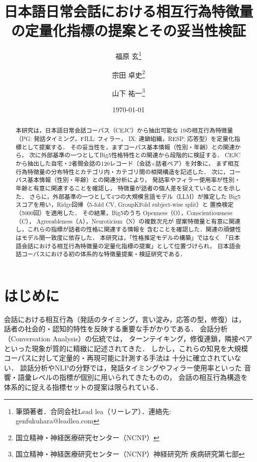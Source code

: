 \documentclass[dvipdfmx,11pt,a4paper]{bxjsarticle}
\title{日本語日常会話における相互行為特徴量の定量化指標の提案とその妥当性検証}
\author{福原 玄\thanks{筆頭著者．合同会社Lead lea（リーレア）．連絡先: genfukuhara@leadlea.com}
\and 宗田 卓史\thanks{国立精神・神経医療研究センター（NCNP）}
\and 山下 祐一\thanks{国立精神・神経医療研究センター（NCNP）神経研究所 疾病研究第七部}}
\date{\today}
\renewcommand{\_}{\paperorigunderscore\allowbreak}%
\begin{document}
\maketitle

\begin{abstract}
本研究は，日本語日常会話コーパス（CEJC）から抽出可能な
19の相互行為特徴量（PG: 発話タイミング，FILL: フィラー，
IX: 連鎖組織，RESP: 応答型）を定量化指標として提案する．
その妥当性を，まずコーパス基本情報（性別・年齢）との関連から，
次に外部基準の一つとしてBig5性格特性との関連から段階的に検証する．
CEJCから抽出した自宅・2者間会話の120レコード（会話$\times$話者ペア）を対象に，
まず相互行為特徴量の分布特性とカテゴリ内・カテゴリ間の相関構造を記述した．
次に，コーパス基本情報（性別・年齢）との関連分析により，
発話率やフィラー使用率が性別・年齢と有意に関連することを確認し，
特徴量が話者の個人差を捉えていることを示した．
さらに，外部基準の一つとして4つの大規模言語モデル（LLM）が推定した
Big5スコアを用い，Ridge回帰（5-fold CV, GroupKFold subject-wise split）と
置換検定（5000回）を適用した．
その結果，Big5のうち Openness（O），Conscientiousness（C），
Agreeableness（A），Neuroticism（N）の複数次元が
提案特徴量と有意に関連し，これらの指標が話者の性格に関連する情報を
含むことを確認した．関連の頑健性はモデル間一致度に依存した．
本研究は，「性格推定モデルの構築」ではなく
「日本語会話における相互行為特徴量の定量化指標の提案」として位置づけられ，
日本語会話コーパスにおける初の体系的な特徴量提案・検証研究である．
\end{abstract}

\section{はじめに}

会話における相互行為（発話のタイミング，言い淀み，応答の型，修復）は，
話者の社会的・認知的特性を反映する重要な手がかりである．
会話分析（Conversation Analysis）の伝統では，
ターンテイキング\cite{sacks1974}，修復連鎖\cite{schegloff1977}，隣接ペアといった現象が質的に精緻に記述されてきた．
しかし，これらの知見を大規模コーパスに対して定量的・再現可能に計測する手法は
十分に確立されていない．
談話分析やNLPの分野では，発話タイミングやフィラー使用率といった
音響・語彙レベルの指標が個別に用いられてきたものの，
会話の相互行為構造を体系的に捉える指標セットの提案は限られている．
\end{document}
